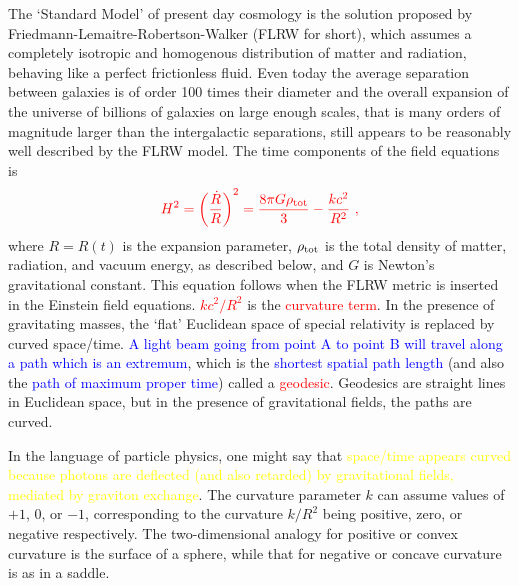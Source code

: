 \documentclass[12pt,a4paper]{article}
\begin{document}
\cite{perkins2008particle} The `Standard Model' of present day cosmology is the solution proposed by Friedmann-Lemaitre-Robertson-Walker (FLRW for short), which assumes a completely isotropic and homogenous distribution of matter and radiation, behaving like a perfect frictionless fluid. Even today the average separation between galaxies is of order 100 times their diameter and the overall expansion of the universe of billions of galaxies on large enough scales, that is many orders of magnitude larger than the intergalactic separations, still appears to be reasonably well described by the FLRW model. The time components of the field equations is
\begin{equation} 
\color{red} H^2 = \left(\dfrac{\dot{R}}{R} \right)^2 = \dfrac{8\pi G \rho_{\rm tot}}{3} - \dfrac{kc^2}{R^2} ~,
\label{eq:Friedmann_time}
\end{equation}
where $R = R(t)$ is the expansion parameter, $\rho_{\rm tot}$ is the total density of matter, radiation, and vacuum energy, as described below, and $G$ is Newton's gravitational constant. This equation follows when the FLRW metric is inserted in the Einstein field equations. \textcolor{red}{$kc^2/R^2$} is the \textcolor{red}{curvature term}. In the presence of gravitating masses, the `flat' Euclidean space of special relativity is replaced by curved space/time. \textcolor{blue}{A light beam going from point A to point B will travel along a path which is an extremum}, which is the \textcolor{blue}{shortest spatial path length} (and also the \textcolor{blue}{path of maximum proper time}) called a \textcolor{red}{geodesic}. Geodesics are straight lines in Euclidean space, but in the presence of gravitational fields, the paths are curved. 

In the language of particle physics, one might say that \textcolor{yellow}{space/time appears curved because photons are deflected (and also retarded) by gravitational fields, mediated by graviton exchange}. The curvature parameter $k$ can assume values of $+1$, $0$, or $-1$, corresponding to the curvature $k/R^2$ being positive, zero, or negative respectively. The two-dimensional analogy for positive or convex curvature is the surface of a sphere, while that for negative or concave curvature is as in a saddle.
\end{document}
